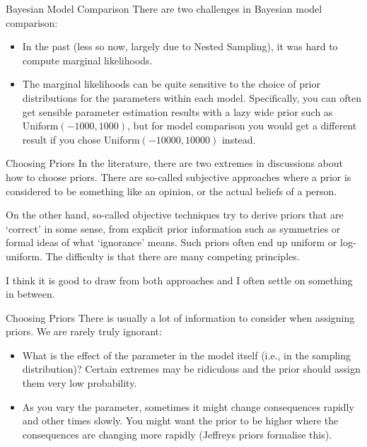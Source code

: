 \documentclass{beamer}
\begin{document}
\begin{frame}[t]{Bayesian Model Comparison}
There are two challenges in Bayesian model comparison:\pause

\begin{itemize}
\item In the past (less so now, largely due to Nested Sampling), it was
hard to compute marginal likelihoods.\pause
\item The marginal likelihoods can be quite sensitive to the choice of
prior distributions for the parameters within each model.
Specifically, you can often get sensible parameter estimation results with
a lazy wide prior such as Uniform$(-1000, 1000)$, but for model comparison
you would get a different result if you chose Uniform$(-10000, 10000)$
instead.
\end{itemize}

\end{frame}


\begin{frame}[t]{Choosing Priors}
In the literature, there are two extremes in discussions about how to choose
priors. There are so-called subjective approaches where a prior is considered
to be something like an opinion, or the actual beliefs of a person.\pause

On the other hand, so-called objective techniques try to derive priors
that are `correct' in some sense, from explicit prior information such as symmetries
or formal ideas of what `ignorance' means. Such priors often end up uniform
or log-uniform.
The difficulty is that there are many competing principles.\pause

I think it is good to draw from both approaches and I often settle on something
in between.
\end{frame}



\begin{frame}[t]{Choosing Priors}
There is usually a lot of information to consider when assigning priors. We
are rarely truly ignorant:

\begin{itemize}
\item What is the effect of the parameter in the model itself (i.e., in the
sampling distribution)? Certain extremes may be ridiculous and the prior
should assign them very low probability.\pause
\item As you vary the parameter, sometimes it might change consequences rapidly
and other times slowly. You might want the prior to be higher where the
consequences are changing more rapidly (Jeffreys priors formalise this).\pause
\end{itemize}


\end{frame}
\end{document}

